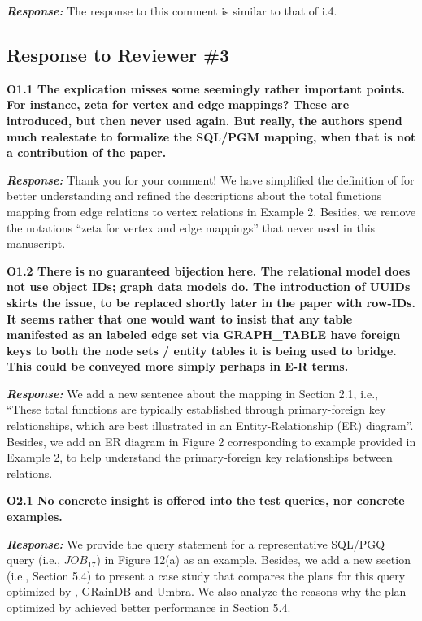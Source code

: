 \textbf{\textit{Response: }}
The response to this comment is similar to that of i.4.


\subsection{Response to Reviewer \#3}

\textbf{
O1.1 The explication misses some seemingly rather important points.
For instance, zeta for vertex and edge mappings? These are introduced, but then never used again. But really, the authors spend much realestate to formalize the SQL/PGM mapping, when that is not a contribution of the paper.}

\textbf{\textit{Response: }}
Thank you for your comment! We have simplified the definition of \rgmapping for better understanding and refined the descriptions about the total functions mapping from edge relations to vertex relations in Example 2.
Besides, we remove the notations ``zeta for vertex and edge mappings'' that never used in this manuscript.


\textbf{
O1.2 There is no guaranteed bijection here. The relational model does not use object IDs; graph data models do. The introduction of UUIDs skirts the issue, to be replaced shortly later in the paper with row-IDs. It seems rather that one would want to insist that any table manifested as an labeled edge set via GRAPH\_TABLE have foreign keys to both the node sets / entity tables it is being used to bridge. This could be conveyed more simply perhaps in E-R terms.}

\textbf{\textit{Response: }}
We add a new sentence about the mapping in Section 2.1, i.e., ``These total functions are typically established through primary-foreign key relationships, which are best illustrated in an Entity-Relationship (ER) diagram''.
Besides, we add an ER diagram in Figure 2 corresponding to example provided in Example 2, to help understand the primary-foreign key relationships between relations.


\textbf{O2.1 No concrete insight is offered into the test queries, nor concrete examples. }

\textbf{\textit{Response: }}
We provide the query statement for a representative SQL/PGQ query (i.e., $JOB_{17}$) in Figure 12(a) as an example.
Besides, we add a new section (i.e., Section 5.4) to present a case study that compares the plans for this query optimized by \name, GRainDB and Umbra.
We also analyze the reasons why the plan optimized by \name achieved better performance in Section 5.4.


